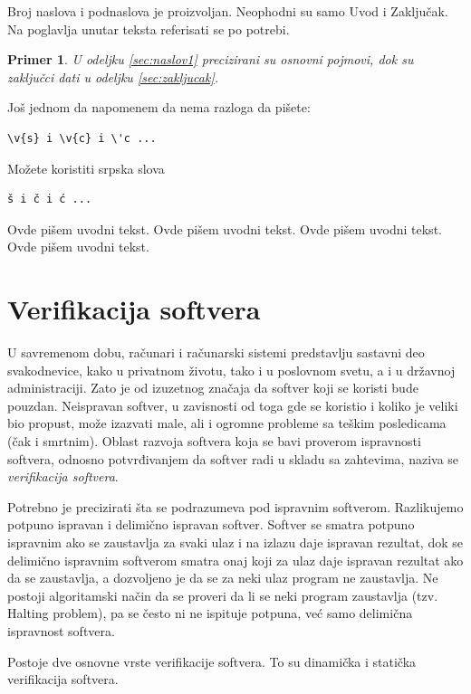 \documentclass[a4paper]{article}
\newtheorem{primer}{Primer}[section]
\begin{document}
{Broj naslova i podnaslova je proizvoljan. Neophodni su samo Uvod i Zaključak. Na poglavlja unutar teksta referisati se po potrebi. 
\begin{primer}
U odeljku \ref{sec:naslov1} precizirani su osnovni pojmovi, dok su zaključci dati u odeljku \ref{sec:zakljucak}.
\end{primer}

Još jednom da napomenem da nema razloga da pišete:
\begin{verbatim}
\v{s} i \v{c} i \'c ...
\end{verbatim}
Možete koristiti srpska slova
\begin{verbatim}
š i č i ć ... 
\end{verbatim}


Ovde pišem uvodni tekst.
Ovde pišem uvodni tekst. 
Ovde pišem uvodni tekst. 
Ovde pišem uvodni tekst. 


\section{Verifikacija softvera}
\label{sec:verifikacija}

\par U savremenom dobu, računari i računarski sistemi predstavlju sastavni deo svakodnevice, kako u privatnom životu, tako i u poslovnom svetu, a i u državnoj administraciji. Zato je od izuzetnog značaja da softver koji se koristi bude pouzdan. Neispravan softver, u zavisnosti od toga gde se koristio i koliko je veliki bio propust, može izazvati male, ali i ogromne probleme sa teškim posledicama (čak i smrtnim). Oblast razvoja softvera koja se bavi proverom ispravnosti softvera, odnosno potvrđivanjem da softver radi u skladu sa zahtevima, naziva se \emph{verifikacija softvera}.

\par Potrebno je precizirati šta se podrazumeva pod ispravnim softverom. Razlikujemo potpuno ispravan i delimično ispravan softver. Softver se smatra potpuno ispravnim ako se zaustavlja za svaki ulaz i na izlazu daje ispravan rezultat, dok se delimično ispravnim softverom smatra onaj koji za ulaz daje ispravan rezultat ako da se zaustavlja, a dozvoljeno je da se za neki ulaz program ne zaustavlja. Ne postoji algoritamski način da se proveri da li se neki program zaustavlja (tzv. Halting problem), pa se često ni ne ispituje potpuna, već samo delimična ispravnost softvera.

\par Postoje dve osnovne vrste verifikacije softvera. To su dinamička i statička verifikacija softvera.

}
\end{document}
